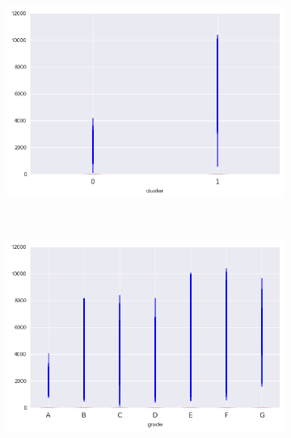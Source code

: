 \begin{anexosenv}
\begin{figure}[t!]
\begin{subfigure}[t]{0.5\textwidth}
            \centerline{\includegraphics[width=1.05\textwidth]{img/out_prncp_by_cluster}}
        \end{subfigure}%
        ~ 
        \begin{subfigure}[t]{0.5\textwidth}
            \centering
   
            \centerline{\includegraphics[width=1.05\textwidth]{img/out_prncp_by_grade}}

        \end{subfigure}
\end{figure}


\begin{figure}[t!]
    \centering
        \caption{total\textunderscore pymnt }
        \begin{subfigure}[t]{0.5\textwidth}
            \centering


\end{subfigure}
\end{figure}
\end{anexosenv}
